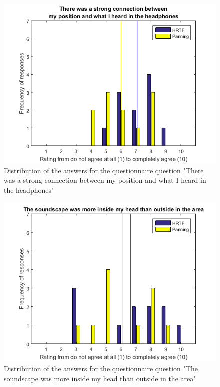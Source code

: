 \documentclass[journal]{IEEEtran}
\begin{document}
\begin{appendices}
\begin{figure}[h!]
  \centering
    \includegraphics[scale=0.6]{graphics/qq3.png}
   \caption{Distribution of the answers for the questionnaire question "There was a strong connection between my position and what I heard in the headphones"}
  \label{fig:plt9}
\end{figure}

\begin{figure}[h!]
  \centering
    \includegraphics[scale=0.6]{graphics/qq4.png}
   \caption{Distribution of the answers for the questionnaire question "The soundscape was more inside my head than outside in the area"}
  \label{fig:plt10}
\end{figure}


\end{appendices}
\end{document}
